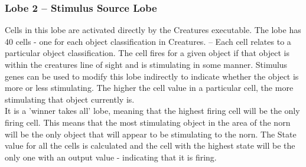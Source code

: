 \documentclass[11pt,twoside,a4paper]{article}
\begin{document}
\subsubsection{Lobe 2 -- Stimulus Source Lobe}

Cells in this lobe are activated directly by the Creatures executable. The lobe has 40 cells - one for each object classification in Creatures. -- Each cell relates to a particular object classification. The cell fires for a given object if that object is within the creatures line of sight and is stimulating in some manner. Stimulus genes can be used to modify this lobe indirectly to indicate whether the object is more or less stimulating. The higher the cell value in a particular cell, the more stimulating that object currently is.~\\

It is a 'winner takes all' lobe, meaning that the highest firing cell will be the only firing cell. This means that the most stimulating object in the area of the norn will be the only object that will appear to be stimulating to the norn. The State value for all the cells is calculated and the cell with the highest state will be the only one with an output value - indicating that it is firing.~\\


\end{document}

